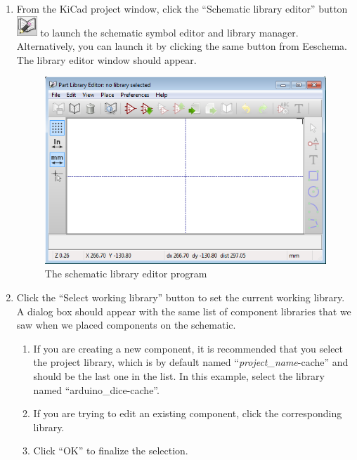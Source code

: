 \documentclass[12pt,letterpaper]{scrartcl}
\begin{document}
\begin{enumerate}
	\item From the KiCad project window, click the ``Schematic library editor'' button \includegraphics[width=0.3in]{sche-lib-icon} to launch the schematic symbol editor and library manager. Alternatively, you can launch it by clicking the same button from Eeschema. The library editor window should appear.
	
	\begin{figure}[h]
		\centering
		\includegraphics[width=0.6\linewidth]{sche-lib-editor}
		\caption{The schematic library editor program}
		\label{fig:sche-lib-editor}
	\end{figure}
	
	\item Click the ``Select working library'' button to set the current working library. A dialog box should appear with the same list of component libraries that we saw when we placed components on the schematic. 
		\begin{enumerate}
			\item If you are creating a new component, it is recommended that you select the project library, which is by default named ``\textit{project\_name}-cache'' and should be the last one in the list. In this example, select the library named ``arduino\_dice-cache''. 
			
			\item If you are trying to edit an existing component, click the corresponding library.
			
			\item Click ``OK'' to finalize the selection. 
		\end{enumerate}
	

\end{enumerate}
\end{document}
